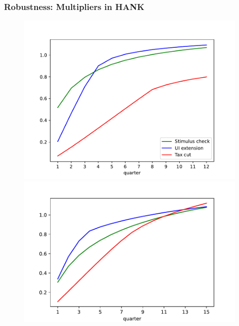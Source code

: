 \documentclass[pdflatex,aspectratio=169]{beamer}
\begin{document}
\begin{frame}
\frametitle{Robustness: Multipliers in HANK}


\begin{figure}
\begin{minipage}[c]{0.48\linewidth}
\includegraphics[scale=0.5]{Code/HA-Models/FromPandemicCode/Figures/Cummulative_multipliers}
\vspace{0.2cm}
\end{minipage}
\hfill
\begin{minipage}[c]{0.48\linewidth}
\includegraphics[scale= 0.5]{Code/HA-Models/FromPandemicCode/Figures/Cumulative_multipliers_HANK}
\vspace{0.2cm}
\end{minipage}
\end{figure}


\end{frame}
\end{document}
